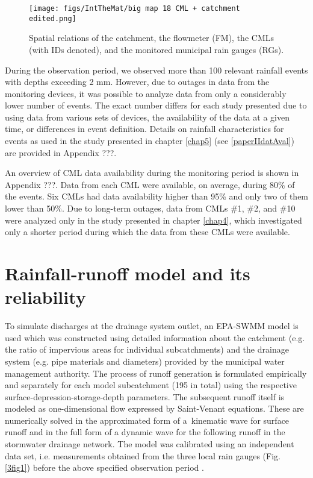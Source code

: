 \documentclass{ctuthesis}\usepackage[]{graphicx}\usepackage[]{color}
\begin{document}
\begin{figure}[p]
\begin{center}
\texttt{[image: figs/IntTheMat/big map 18 CML + catchment edited.png]}
\caption{ Spatial relations of the catchment, the flowmeter (FM), the CMLs (with IDs denoted), and the monitored municipal rain gauges (RGs).} \label{3fig2}
\end{center}
\end{figure}

During the observation period, we observed more than 100 relevant rainfall events with depths exceeding 2 mm. However, due to outages in data from the monitoring devices, it was possible to analyze data from only a considerably lower number of events. The exact number differs for each study presented due to using data from various sets of devices, the availability of the data at a given time, or differences in event definition. Details on rainfall characteristics for events as used in the study presented in chapter \ref{chap5} (see \ref{paperIIdatAval}) are provided in Appendix ???.

An overview of CML data availability during the monitoring period is shown in Appendix ???. Data from each CML were available, on average, during 80\% of the events. Six CMLs had data availability higher than 95\% and only two of them lower than 50\%. Due to long-term outages, data from CMLs  \#1, \#2, and \#10 were analyzed only in the study presented in chapter \ref{chap4}, which investigated only a shorter period during which the data from these CMLs were available.


\section{Rainfall-runoff model and its reliability} \label{RRmodel}

To simulate discharges at the drainage system outlet, an EPA-SWMM model is used which was constructed using detailed information about the catchment (e.g. the ratio of impervious areas for individual subcatchments) and the drainage system (e.g. pipe materials and diameters) provided by the municipal water management authority. The process of runoff generation is formulated empirically and separately for each model subcatchment (195 in total) using the respective surface-depression-storage-depth parameters. The subsequent runoff itself is modeled as one-dimensional flow expressed by Saint-Venant equations. These are numerically solved in the approximated form of a~kinematic wave for surface runoff and in the full form of a dynamic wave for the following runoff in the stormwater drainage network. The model was calibrated using an independent data set, i.e. measurements obtained from the three local rain gauges (Fig. \ref{3fig1}) before the above specified observation period \citep{bakalarka}. 
\end{document}
